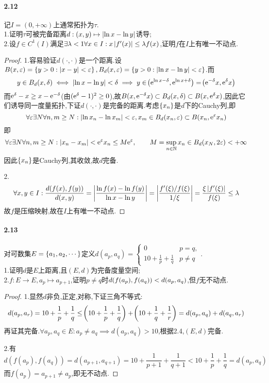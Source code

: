 \documentclass[UTF8]{article}
\begin{document}
\paragraph*{2.12}记$I=(0,+\infty)$上通常拓扑为$\tau$.\\ 1.证明$\tau$可被完备距离$d:(x,y)\mapsto \left|\ln x-\ln y\right|$诱导;\\
2.设$f\in C^1(I)$满足$\exists \lambda<1\forall x\in I:x\left|f'(x)\right|\leq \lambda f(x)$,证明$f$在$I$上有唯一不动点.
\begin{proof}
    1.容易验证$d(\cdot,\cdot)$是一个距离.设$B(x,\varepsilon)=\left\{y>0:|x-y|<\varepsilon\right\},B_d(x,\varepsilon)=\left\{y>0:\left|\ln x-\ln y\right|<\varepsilon\right\}$.而$$y\in B_d(x,\delta)\iff \left|\ln x-\ln y\right|<\delta\implies y\in \!\left(\mathrm{e}^{\ln x-\delta},\mathrm{e}^{\ln x+\delta}\right)=\!\left(\mathrm{e}^{-\delta}x,\mathrm{e}^\delta x\right)$$
    而$\mathrm{e}^\delta-x\geq x-\mathrm{e}^{-\delta}$(由$(\mathrm{e}^\delta-1)^2\geq 0$),故$B(x,\mathrm{e}^{-\delta} x)\subset B_d(x,\delta)\subset B(x,\mathrm{e}^\delta x)$,因此它们诱导同一度量拓扑,下证$d(\cdot,\cdot)$是完备的距离.考虑$\left\{x_n\right\}$是$d$下的Cauchy列,即$$\forall \varepsilon\exists N\forall n,m\geq N:\left|\ln x_n-\ln x_m\right|<\varepsilon,x_m\in B_d(x_n,\varepsilon)\subset B(x_n,\mathrm{e}^\varepsilon x_n)$$
    即$$\forall \varepsilon\exists N\forall n,m\geq N:|x_n-x_m|<\mathrm{e}^\varepsilon x_n\leq M\mathrm{e}^\varepsilon,\qquad M=\sup_{n\in \mathbb{N}}x_n\in B_d(x_N,2\varepsilon)<+\infty$$
    因此$\left\{x_n\right\}$是Cauchy列,其收敛,故$d$完备.

    2.$$\forall x,y\in I:\frac{d(f(x),f(y))}{d(x,y)}=\left|\frac{\ln f(x)-\ln f(y)}{\ln x-\ln y}\right|=\left|\frac{f'(\xi)/f(\xi)}{1/\xi}\right|=\frac{\xi\left|f'(\xi)\right|}{f(\xi)}\leq \lambda$$
    故$f$是压缩映射,故在$I$上有唯一不动点.
\end{proof}

\paragraph*{2.13}对可数集$E=\left\{a_1,a_2,\cdots\right\}$定义$ d(a_p,a_q)=\begin{cases}
    0&p=q,\\ 10+\frac{1}{p}+\frac{1}{q}&p\neq q
\end{cases}$.\\
1.证明$d$是$E$上距离,且$(E,d)$为完备度量空间;\\
2.$f:E\to E, a_p\mapsto a_{p+1}$,证明$p\neq q$时$d\!\left(f(a_p),f(a_q)\right)<d(a_p,a_q)$,但$f$无不动点.
\begin{proof}
    1.显然$d$非负,正定,对称,下证三角不等式:$$d(a_p,a_r)=10+\frac{1}{p}+\frac{1}{q}\leq \!\left(10+\frac{1}{p}+\frac{1}{q}\right)+\!\left(10+\frac{1}{q}+\frac{1}{r}\right)=d(a_p,a_q)+d(a_q,a_r)$$
    再证其完备.$\forall a_p,a_q\in E:a_p\neq a_q\implies d(a_p,a_q)>10$,根据2.4,$(E,d)$完备.

    2.有$$d(f(a_p),f(a_q))=d(a_{p+1},a_{q+1})=10+\frac{1}{p+1}+\frac{1}{q+1}<10+\frac{1}{p}+\frac{1}{q}=d(a_p,a_q)$$
    而$f(a_p)=a_{p+1}\neq a_p$,即无不动点.
\end{proof}
\end{document}
